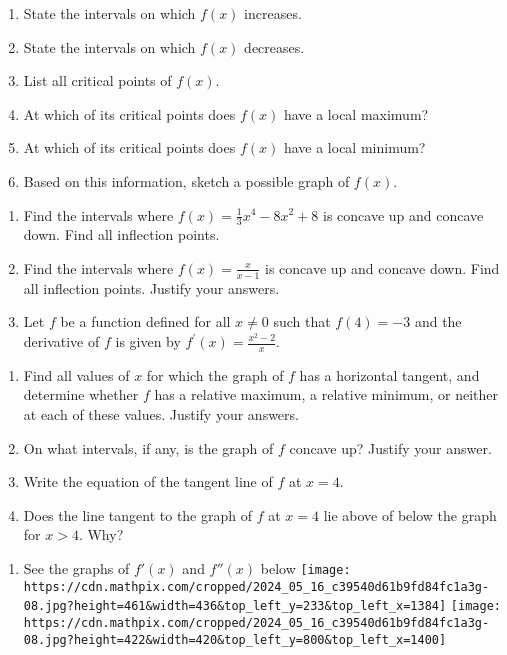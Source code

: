 \documentclass[
]{article}
\providecommand{\tightlist}{%
  \setlength{\itemsep}{0pt}\setlength{\parskip}{0pt}}
\begin{document}
\begin{enumerate}
\def\labelenumi{\alph{enumi})}
\item
  State the intervals on which \(f(x)\) increases.
\item
  State the intervals on which \(f(x)\) decreases.
\item
  List all critical points of \(f(x)\).
\item
  At which of its critical points does \(f(x)\) have a local maximum?
\item
  At which of its critical points does \(f(x)\) have a local minimum?
\item
  Based on this information, sketch a possible graph of \(f(x)\).
\end{enumerate}

\begin{enumerate}
\def\labelenumi{\arabic{enumi}.}
\setcounter{enumi}{8}
\item
  Find the intervals where \(f(x)=\frac{1}{3} x^{4}-8 x^{2}+8\) is
  concave up and concave down. Find all inflection points.
\item
  Find the intervals where \(f(x)=\frac{x}{x-1}\) is concave up and
  concave down. Find all inflection points. Justify your answers.
\item
  Let \(f\) be a function defined for all \(x \neq 0\) such that
  \(f(4)=-3\) and the derivative of \(f\) is given by
  \(f^{\prime}(x)=\frac{x^{2}-2}{x}\).
\end{enumerate}

\begin{enumerate}
\def\labelenumi{\alph{enumi})}
\item
  Find all values of \(x\) for which the graph of \(f\) has a horizontal
  tangent, and determine whether \(f\) has a relative maximum, a
  relative minimum, or neither at each of these values. Justify your
  answers.
\item
  On what intervals, if any, is the graph of \(f\) concave up? Justify
  your answer.
\item
  Write the equation of the tangent line of \(f\) at \(x=4\).
\item
  Does the line tangent to the graph of \(f\) at \(x=4\) lie above of
  below the graph for \(x>4\). Why?
\end{enumerate}

\begin{enumerate}
\def\labelenumi{\arabic{enumi}.}
\setcounter{enumi}{13}
\tightlist
\item
  See the graphs of \(f'(x)\) and \(f''(x)\) below
  \texttt{[image: https://cdn.mathpix.com/cropped/2024\_05\_16\_c39540d61b9fd84fc1a3g-08.jpg?height=461\&width=436\&top\_left\_y=233\&top\_left\_x=1384]}
  \texttt{[image: https://cdn.mathpix.com/cropped/2024\_05\_16\_c39540d61b9fd84fc1a3g-08.jpg?height=422\&width=420\&top\_left\_y=800\&top\_left\_x=1400]}
\end{enumerate}
\end{document}
